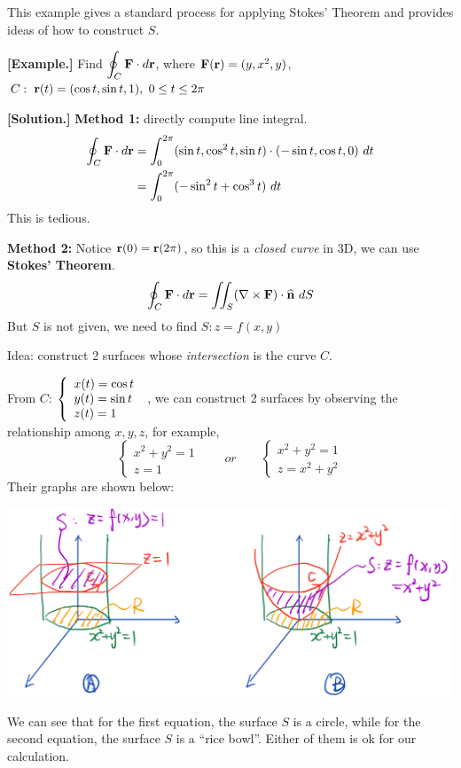 \documentclass[11pt, a4paper]{MATH2023}
\newcommand{\eg}{\textbf{[Example.] }}
\newcommand{\sol}{\textbf{[Solution.] }}
\newcommand{\rr}{{\bf r}}
\newcommand{\FF}{{\bf F}}
\newcommand{\nm}{\widehat{\bf n}}
\begin{document}
\begin{spacing}{1.3}
    \newpage
    {\blue This example gives a standard process for applying Stokes' Theorem and provides ideas of 
    how to construct $S$.}

    \eg Find $\disp \oint_C \FF\cdot d\rr$, where $\FF(\rr)=(y,x^2,y)$, $C:\ \rr(t)=(\cos t, \sin t, 1),
    \ 0\le t\le 2\pi$

    \sol {\bf Method 1: } directly compute line integral.
    \begin{align*}
        \oint_C \FF\cdot d\rr &= \int_0^{2\pi} (\sin t, \cos^2 t, \sin t)\cdot (-\sin t, \cos t,0)\ dt\\
        &= \int_0^{2\pi} (-\sin^2 t+\cos^3 t)\ dt
    \end{align*}
    This is tedious.
    
    \vspace{0.3in}
    {\bf Method 2:}
    Notice $\rr(0)=\rr(2\pi)$, so this is a {\it closed curve} in 3D, we can use {\bf Stokes' Theorem}.
    $$\oint_C \FF\cdot d\rr =\iint_S (\nabla\times \FF)\cdot \nm \ dS$$
    {\blue But $S$ is not given, we need to find $S: z=f(x,y)$}

    {\blue Idea: construct 2 surfaces whose {\it intersection} is the curve $C$}.

    From $C$: $\displaystyle \left\{\begin{array}{l}
        x(t)=\cos t\\ y(t)=\sin t\\ z(t)=1
    \end{array} \right.$
    , we can construct 2 surfaces by observing the relationship among $x,y,z$, for example,
    $$\left\{\begin{array}{l}
        x^2+y^2=1\\ z=1
    \end{array} \right. \qquad or \qquad 
    \left\{\begin{array}{l}
        x^2+y^2=1\\ z=x^2+y^2
    \end{array} \right.$$
    Their graphs are shown below:
    \begin{center}
        \includegraphics[scale=0.24]{images/Ch16-Stoke-eg.jpeg}
    \end{center}
    We can see that for the first equation, the surface $S$ is a circle, while for the second equation,
    the surface $S$ is a ``rice bowl''. Either of them is ok for our calculation.


\end{spacing}
\end{document}
